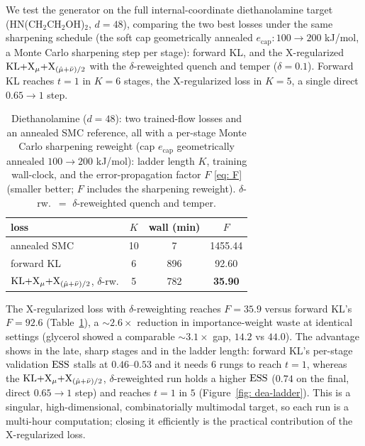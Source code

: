 \documentclass{article}
\begin{document}
We test the generator on the full internal-coordinate diethanolamine target (\mbox{HN(CH$_2$CH$_2$OH)$_2$},
$d = 48$), comparing the two best losses under the same sharpening schedule (the soft cap geometrically
annealed $e_{\mathrm{cap}}\!:\!100\!\to\!200$ kJ/mol, a Monte Carlo sharpening step per stage): forward KL, and the X-regularized
$\mathrm{KL}{+}\mathrm{X}_\mu{+}\mathrm{X}_{(\hat\mu+\bar\nu)/2}$ with the $\delta$-reweighted quench and temper ($\delta = 0.1$).
Forward KL reaches $t = 1$ in $K = 6$ stages, the X-regularized loss in $K = 5$, a single direct
$0.65 \to 1$ step.

\begin{table}[h]
    \centering
    \small
    \begin{tabular}{@{}lccc@{}}
        \toprule
        loss & $K$ & wall (min) & $F$ \\
        \midrule
        annealed SMC                                            & 10 & 7 & 1455.44 \\
        forward KL                                              & 6 & 896 & 92.60 \\
        $\mathrm{KL}{+}\mathrm{X}_\mu{+}\mathrm{X}_{(\hat\mu+\bar\nu)/2}$, $\delta$-rw. & 5 & 782 & \textbf{35.90} \\
        \bottomrule
    \end{tabular}
    \caption{Diethanolamine ($d = 48$): two trained-flow losses and an annealed SMC reference, all with
    a per-stage Monte Carlo sharpening reweight (cap $e_{\mathrm{cap}}$ geometrically annealed $100 \to 200$ kJ/mol): ladder length
    $K$, training wall-clock, and the error-propagation factor $F$ \eqref{eq: F} (smaller better; $F$ includes
    the sharpening reweight). $\delta$-rw.\ $=$
    $\delta$-reweighted quench and temper.}
    \label{tab: dea}
\end{table}

The X-regularized loss with $\delta$-reweighting reaches $F = 35.9$ versus forward KL's $F = 92.6$ (Table~\ref{tab: dea}), a
${\sim}2.6\times$ reduction in importance-weight waste at identical settings (glycerol showed a comparable
${\sim}3.1\times$ gap, $14.2$ vs $44.0$). The advantage shows in the late, sharp stages and in the ladder
length: forward KL's per-stage validation $\mathrm{ESS}$ stalls at $0.46$--$0.53$ and it needs $6$ rungs to reach
$t = 1$, whereas the $\mathrm{KL}{+}\mathrm{X}_\mu{+}\mathrm{X}_{(\hat\mu+\bar\nu)/2}$, $\delta$-reweighted run holds a higher $\mathrm{ESS}$
($0.74$ on the final, direct $0.65 \to 1$ step) and reaches $t = 1$ in $5$ (Figure~\ref{fig: dea-ladder}). This
is a singular, high-dimensional, combinatorially multimodal target, so each run is a multi-hour computation;
closing it efficiently is the practical contribution of the X-regularized loss.
\end{document}
